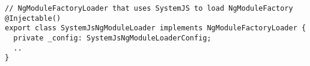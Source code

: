 \begin{verbatim}
// NgModuleFactoryLoader that uses SystemJS to load NgModuleFactory
@Injectable()
export class SystemJsNgModuleLoader implements NgModuleFactoryLoader {
  private _config: SystemJsNgModuleLoaderConfig;
  ..
}
\end{verbatim}
